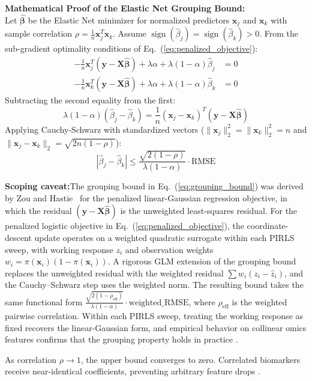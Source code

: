 \documentclass[11pt,oneside]{book}
\begin{document}
\begin{deepdive}[top=3pt, bottom=3pt, before skip=3pt, after skip=3pt]
\textbf{Mathematical Proof of the Elastic Net Grouping Bound:}\\
Let $\hat{\boldsymbol{\beta}}$ be the Elastic Net minimizer for normalized predictors $\mathbf{x}_j$ and $\mathbf{x}_k$ with sample correlation $\rho = \frac{1}{n}\mathbf{x}_j^T \mathbf{x}_k$. Assume $\operatorname{sign}(\hat{\beta}_j) = \operatorname{sign}(\hat{\beta}_k) > 0$.
From the sub-gradient optimality conditions of Eq.~(\ref{eq:penalized_objective}):
\begin{align}
-\frac{1}{n}\mathbf{x}_j^T (\mathbf{y} - \mathbf{X}\hat{\boldsymbol{\beta}}) + \lambda \alpha + \lambda(1 - \alpha)\hat{\beta}_j &= 0 \\
-\frac{1}{n}\mathbf{x}_k^T (\mathbf{y} - \mathbf{X}\hat{\boldsymbol{\beta}}) + \lambda \alpha + \lambda(1 - \alpha)\hat{\beta}_k &= 0
\end{align}
Subtracting the second equality from the first:
\begin{equation}
\lambda(1 - \alpha)(\hat{\beta}_j - \hat{\beta}_k) = \frac{1}{n}(\mathbf{x}_j - \mathbf{x}_k)^T (\mathbf{y} - \mathbf{X}\hat{\boldsymbol{\beta}})
\end{equation}
Applying Cauchy-Schwarz with standardized vectors ($\|\mathbf{x}_j\|_2^2 = \|\mathbf{x}_k\|_2^2 = n$ and $\|\mathbf{x}_j - \mathbf{x}_k\|_2 = \sqrt{2n(1 - \rho)}$):
\begin{equation}
|\hat{\beta}_j - \hat{\beta}_k| \le \frac{\sqrt{2(1 - \rho)}}{\lambda(1 - \alpha)} \cdot \text{RMSE}
\label{eq:grouping_bound}
\end{equation}

\textbf{Scoping caveat:}\enspace The grouping bound in Eq.~(\ref{eq:grouping_bound}) was derived by Zou and Hastie~\cite{zou2005regularization} for the penalized linear-Gaussian regression objective, in which the residual $(\mathbf{y} - \mathbf{X}\hat{\boldsymbol{\beta}})$ is the unweighted least-squares residual. For the penalized logistic objective in Eq.~(\ref{eq:penalized_objective}), the coordinate-descent update operates on a weighted quadratic surrogate within each PIRLS sweep, with working response $z_i$ and observation weights $w_i = \pi(\mathbf{x}_i)(1 - \pi(\mathbf{x}_i))$. A rigorous GLM extension of the grouping bound replaces the unweighted residual with the weighted residual $\sum w_i (z_i - \hat{z}_i)$, and the Cauchy--Schwarz step uses the weighted norm. The resulting bound takes the same functional form $\frac{\sqrt{2(1 - \rho_{\text{eff}})}}{\lambda(1 - \alpha)} \cdot \text{weighted\_RMSE}$, where $\rho_{\text{eff}}$ is the weighted pairwise correlation. Within each PIRLS sweep, treating the working response as fixed recovers the linear-Gaussian form, and empirical behavior on collinear omics features confirms that the grouping property holds in practice \cite{zou2005regularization, friedman2010regularization}.

As correlation $\rho \to 1$, the upper bound converges to zero. Correlated biomarkers receive near-identical coefficients, preventing arbitrary feature drops \cite{zou2005regularization}.
\end{deepdive}
\end{document}
